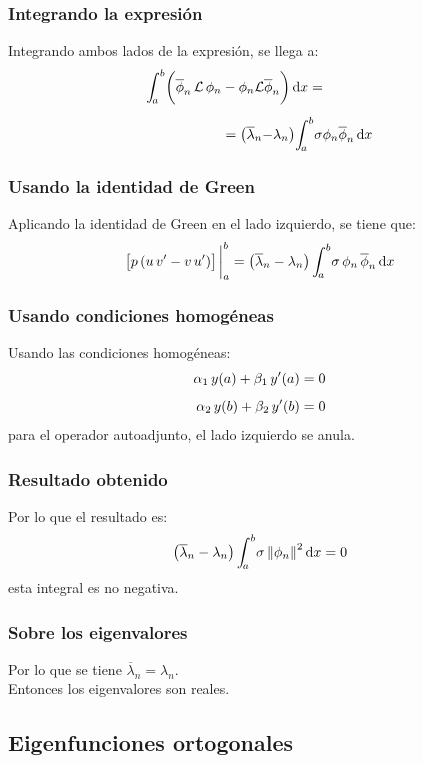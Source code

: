 \documentclass[12pt]{beamer}
\begin{document}
\begin{frame}
\frametitle{Integrando la expresión}
Integrando ambos lados de la expresión, se llega a:
\pause
\begin{align*}
\scaleint{5ex}_{\bs a}^{b} \bigg( \overline{\phi}_{n} \, \mathcal{L} \, \phi_{n} &- \phi_{n} \mathcal{L} \overline{\phi}_{n} \bigg) \dd{x} = \\[0.5em]
&=\big( \overline{\lambda}_{n} {-} \lambda_{n} \big) \scaleint{5ex}_{\bs a}^{b} \sigma \phi_{n} \overline{\phi}_{n} \dd{x}
\end{align*}
\end{frame}
\begin{frame}
\frametitle{Usando la identidad de Green}
Aplicando la identidad de Green en el lado izquierdo, se tiene que:
\pause
\begin{align*}
\big[ p \, (u \, \pderivada{v} - v \, \pderivada{u}) \big]\eval_{a}^{b} = \big( \overline{\lambda}_{n} - \lambda_{n} \big) \, \scaleint{5ex}_{\bs a}^{b} \sigma \, \phi_{n} \, \overline{\phi}_{n} \dd{x}
\end{align*}
\end{frame}
\begin{frame}
\frametitle{Usando condiciones homogéneas}
Usando las condiciones homogéneas:
\pause
\begin{align*}
\alpha_{1} \, y(a) + \beta_{1} \, {y}^{\prime} (a) &= 0 \\[0.5em]
\alpha_{2} \, y(b) + \beta_{2} \, {y}^{\prime} (b) &= 0
\end{align*}
para el operador autoadjunto, el lado izquierdo se anula.
\end{frame}
\begin{frame}
\frametitle{Resultado obtenido}
Por lo que el resultado es:
\pause
\begin{align*}
\big( \overline{\lambda}_{n} - \lambda_{n} \big) \, \scaleint{5ex}_{\bs a}^{b} \sigma \, \norm{\phi_{n}}^{2} \dd{x} = 0
\end{align*}
esta integral es no negativa.
\end{frame}
\begin{frame}
\frametitle{Sobre los eigenvalores}
Por lo que se tiene $\overline{\lambda}_{n} = \lambda_{n}$.
\\
\bigskip
\pause
 Entonces los eigenvalores son reales.
\end{frame}

\subsection{Eigenfunciones ortogonales}
\end{document}
